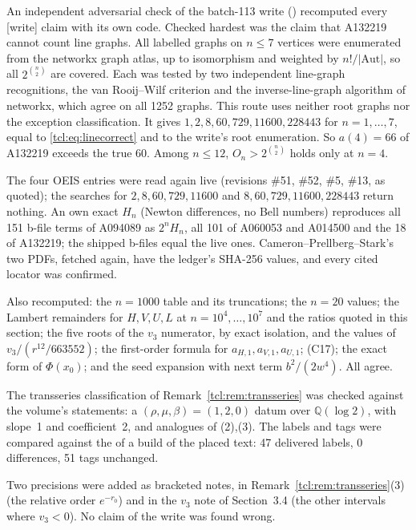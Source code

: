 \begin{writenote}\raggedright
An independent adversarial check of the batch-113 write () recomputed every [write] claim with
its own code. Checked hardest was the claim that A132219 cannot
count line graphs. All labelled graphs on $n\le7$ vertices were enumerated from the networkx graph atlas, up to
isomorphism and weighted by $n!/|\mathrm{Aut}|$, so all $2^{\binom n2}$ are covered. Each was tested by two
independent line-graph recognitions, the van Rooij--Wilf criterion and the inverse-line-graph algorithm of
networkx, which agree on all 1252 graphs. This route uses neither root graphs nor the exception
classification. It gives $1,2,8,60,729,11600,228443$ for $n=1,\ldots,7$, equal to
\eqref{tcl:eq:linecorrect} and to the write's root enumeration. So $a(4)=66$ of A132219 exceeds the true $60$.
Among $n\le12$, $O_n>2^{\binom n2}$ holds only at $n=4$.

The four OEIS entries were read again live (revisions \#51, \#52, \#5, \#13, as quoted); the searches for
$2,8,60,729,11600$ and $8,60,729,11600,228443$ return nothing. An own exact $H_n$ (Newton differences,
no Bell numbers) reproduces all 151 b-file terms of A094089 as $2^nH_n$, all 101 of A060053 and A014500 and
the 18 of A132219; the shipped b-files equal the live ones. Cameron--Prellberg--Stark's two PDFs, fetched
again, have the ledger's SHA-256 values, and every cited locator was confirmed.

Also recomputed: the $n=1000$ table and its truncations; the $n=20$ values; the Lambert remainders for
$H,V,U,L$ at $n=10^4,\ldots,10^7$ and the ratios quoted in this section; the five roots of the $v_3$
numerator, by exact isolation, and the values of $v_3/(r^{12}/663552)$; the first-order formula for
$a_{H,1},a_{V,1},a_{U,1}$; (C17); the exact form of $\Phi(x_0)$; and the seed expansion with next term
$b^2/(2w^4)$. All agree.

The transseries classification of Remark~\ref{tcl:rem:transseries} was checked against the volume's
statements: a $(\rho,\mu,\beta)=(1,2,0)$ datum over $\mathbb Q(\log2)$,  with slope~1
and coefficient~2, and analogues of (2),(3). The labels and tags were compared against the
 of a build of the placed text: 47 delivered labels, 0 differences, 51 tags unchanged.

Two precisions were added as bracketed notes, in Remark~\ref{tcl:rem:transseries}(3) (the relative order
$e^{-r_0}$) and in the $v_3$ note of Section~3.4 (the other intervals where $v_3<0$). No claim of the write was
found wrong.
\end{writenote}
